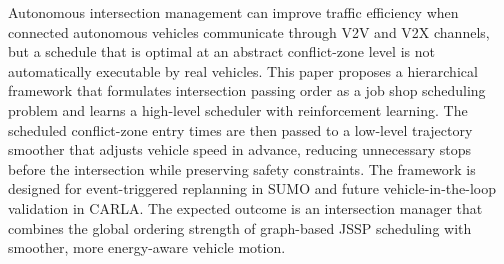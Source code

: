 Autonomous intersection management can improve traffic efficiency when connected autonomous vehicles communicate through V2V and V2X channels, but a schedule that is optimal at an abstract conflict-zone level is not automatically executable by real vehicles. This paper proposes a hierarchical framework that formulates intersection passing order as a job shop scheduling problem and learns a high-level scheduler with reinforcement learning.  The scheduled conflict-zone entry times are then passed to a low-level trajectory smoother that adjusts vehicle speed in advance, reducing unnecessary stops before the intersection while preserving safety constraints. The framework is designed for event-triggered replanning in SUMO and future vehicle-in-the-loop validation in CARLA. The expected outcome is an intersection manager that combines the global ordering strength of graph-based JSSP scheduling with smoother, more energy-aware vehicle motion.
